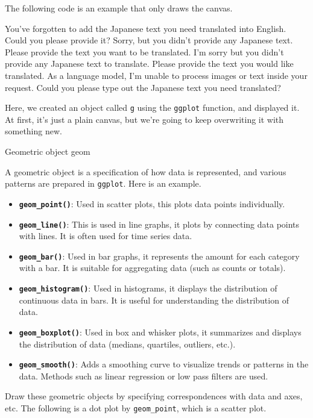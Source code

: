 \documentclass[
  a4paper,
]{book}
\providecommand{\tightlist}{%
  \setlength{\itemsep}{0pt}\setlength{\parskip}{0pt}}\usepackage{longtable,booktabs,array}
\begin{document}
The following code is an example that only draws the canvas.

You've forgotten to add the Japanese text you need translated into
English. Could you please provide it? Sorry, but you didn't provide any
Japanese text. Please provide the text you want to be translated. I'm
sorry but you didn't provide any Japanese text to translate. Please
provide the text you would like translated. As a language model, I'm
unable to process images or text inside your request. Could you please
type out the Japanese text you need translated?

Here, we created an object called \texttt{g} using the \texttt{ggplot}
function, and displayed it. At first, it's just a plain canvas, but
we're going to keep overwriting it with something new.

Geometric object geom

A geometric object is a specification of how data is represented, and
various patterns are prepared in \texttt{ggplot}. Here is an example.

\begin{itemize}
\tightlist
\item
  \textbf{\texttt{geom\_point()}}: Used in scatter plots, this plots
  data points individually.
\item
  \textbf{\texttt{geom\_line()}}: This is used in line graphs, it plots
  by connecting data points with lines. It is often used for time series
  data.
\item
  \textbf{\texttt{geom\_bar()}}: Used in bar graphs, it represents the
  amount for each category with a bar. It is suitable for aggregating
  data (such as counts or totals).
\item
  \textbf{\texttt{geom\_histogram()}}: Used in histograms, it displays
  the distribution of continuous data in bars. It is useful for
  understanding the distribution of data.
\item
  \textbf{\texttt{geom\_boxplot()}}: Used in box and whisker plots, it
  summarizes and displays the distribution of data (medians, quartiles,
  outliers, etc.).
\item
  \textbf{\texttt{geom\_smooth()}}: Adds a smoothing curve to visualize
  trends or patterns in the data. Methods such as linear regression or
  low pass filters are used.
\end{itemize}

Draw these geometric objects by specifying correspondences with data and
axes, etc. The following is a dot plot by \texttt{geom\_point}, which is
a scatter plot.
\end{document}

